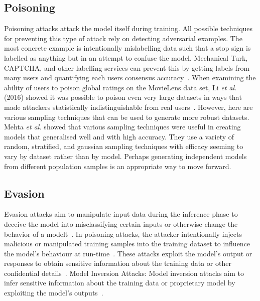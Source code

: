 \subsection{Poisoning}
\label{subsec:poisoning_attacks}
Poisoning attacks attack the model itself during training. All possible techniques for preventing this type of attack rely on detecting adversarial examples. The most concrete example is intentionally mislabelling data such that a stop sign is labelled as anything but in an attempt to confuse the model. Mechanical Turk, CAPTCHA, and other labelling services can prevent this by getting labels from many users and quantifying each users consensus accuracy~\cite{ahn2003captcha}. When examining the ability of users to poison global ratings on the MovieLens data set, Li \textit{et al.} (2016) showed it was possible to poison even very large datasets in ways that made attackers statistically indistinguishable from real users~\cite{li_general_2016}. However, here are various sampling techniques that can be used to generate more robust datasets. Mehta \textit{et al.} showed that various sampling techniques were useful in creating models that generalised well and with high accuracy. They use a variety of random, stratified, and gaussian sampling techniques with efficacy seeming to vary by dataset rather than by model. Perhaps generating independent models from different population samples is an appropriate way to move forward.

\subsection{Evasion}
\label{subsec:evasion_attacks}
Evasion attacks aim to manipulate input data during the inference phase to deceive the model into misclassifying certain inputs or otherwise change the behavior of a modelt~\cite{ carlini_towards_2017, adversarialpatch, pixelattack, hopskipjump}. In poisoning attacks, the attacker intentionally injects malicious or manipulated training samples into the training dataset to influence the model's behaviour at run-time~\cite{biggio_poisoning_2013, saha2020hidden}. These attacks exploit the model's output or responses to obtain sensitive information about the training data or other confidential details~\cite{chakraborty_adversarial_2018, orekondy2019knockoff}.
Model Inversion Attacks: Model inversion attacks aim to infer sensitive information about the training data or proprietary model by exploiting the model's outputs~\cite{chakraborty_adversarial_2018, choquette2021label, li2021membership}. 

